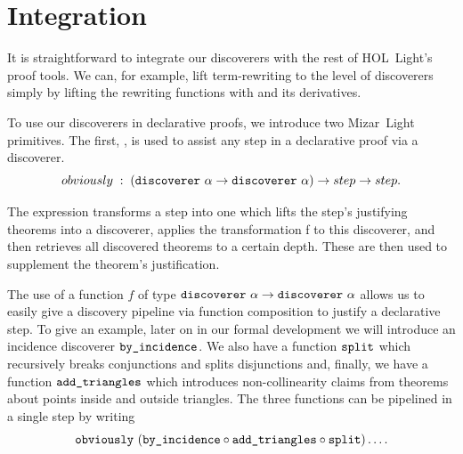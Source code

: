 
\section{Integration}
It is straightforward to integrate our discoverers with the rest of HOL~Light's proof tools. We can, for example, lift term-rewriting to the level of discoverers simply by lifting the rewriting functions with  and its derivatives. 

To use our discoverers in declarative proofs, we introduce two Mizar~Light primitives. The first, , is used to assist any step in a declarative proof via a discoverer.
\begin{displaymath}
  obviously\;:\;(\code{discoverer}\ \alpha\rightarrow\code{discoverer}\ \alpha) \rightarrow step \rightarrow step.
\end{displaymath}

The expression  transforms a step into one which lifts the step's justifying theorems into a discoverer, applies the transformation f to this discoverer, and then retrieves all discovered theorems to a certain depth. These are then used to supplement the theorem's justification.

The use of a function $f$ of type $\code{discoverer}\ \alpha\rightarrow\code{discoverer}\ \alpha$ allows us to easily give a discovery pipeline via function composition to justify a declarative step. To give an example, later on in our formal development we will introduce an incidence discoverer $\texttt{by\_incidence}$. We also have a function $\texttt{split}$  which recursively breaks conjunctions and splits disjunctions and, finally, we have a function $\texttt{add\_triangles}$ which introduces non-collinearity claims from theorems about points inside and outside triangles. The three functions can be pipelined in a single step by writing
\begin{displaymath}
\code{obviously}\ (\code{by\_incidence}\circ \code{add\_triangles}\circ \code{split}) \ldots.
\end{displaymath}

